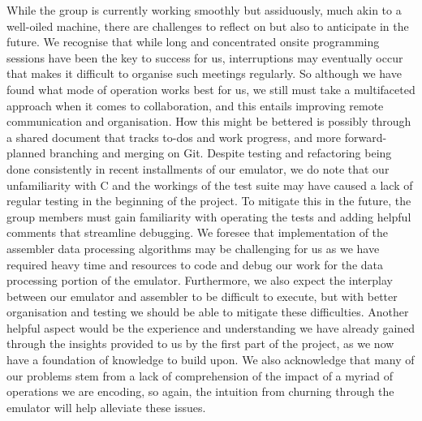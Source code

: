 \documentclass[11pt]{article}
\begin{document}
While the group is currently working smoothly but assiduously, much akin to a well-oiled machine, there are challenges to reflect on but also to anticipate in the future. We recognise that while long and concentrated onsite programming sessions have been the key to success for us, interruptions may eventually occur that makes it difficult to organise such meetings regularly. So although we have found what mode of operation works best for us, we still must take a multifaceted approach when it comes to collaboration, and this entails improving remote communication and organisation. How this might be bettered is possibly through a shared document that tracks to-dos and work progress, and more forward-planned branching and merging on Git. \newline \indent Despite testing and refactoring being done consistently in recent installments of our emulator, we do note that our unfamiliarity with C and the workings of the test suite may have caused a lack of regular testing in the beginning of the project. To mitigate this in the future, the group members must gain familiarity with operating the tests and adding helpful comments that streamline debugging. \newline \indent We foresee that implementation of the assembler data processing algorithms may be challenging for us as we have required heavy time and resources to code and debug our work for the data processing portion of the emulator. Furthermore, we also expect the interplay between our emulator and assembler to be difficult to execute, but with better organisation and testing we should be able to mitigate these difficulties. Another helpful aspect would be the experience and understanding we have already gained through the insights provided to us by the first part of the project, as we now have a foundation of knowledge to build upon. We also acknowledge that many of our problems stem from a lack of comprehension of the impact of a myriad of operations we are encoding, so again, the intuition from churning through the emulator will help alleviate these issues.
\end{document}
